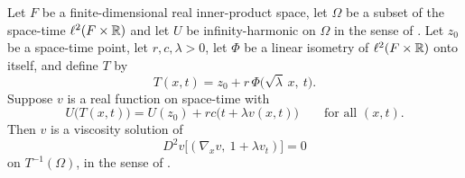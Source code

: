 \begin{lemma}
Let $F$ be a finite-dimensional real inner-product space, let $\Omega$ be a
subset of the space-time $\ell^2(F\times\mathbb{R})$ and let $U$ be infinity-harmonic on
$\Omega$ in the sense of . Let $z_0$ be a space-time
point, let $r,c,\lambda>0$, let $\Phi$ be a linear isometry of
$\ell^2(F\times\mathbb{R})$ onto itself, and define $T$ by
\[
  T(x,t)=z_0+r\,\Phi\bigl(\sqrt\lambda\,x,\ t\bigr).
\]
Suppose $v$ is a real function on space-time with
\begin{equation}\label{eq:anisotropic-rescaling}
  U\bigl(T(x,t)\bigr)=U(z_0)+rc\bigl(t+\lambda v(x,t)\bigr)
  \qquad\text{for all }(x,t).
\end{equation}
Then $v$ is a viscosity solution of
\[
  D^2v\bigl[(\nabla_xv,\ 1+\lambda v_t)\bigr]=0
\]
on $T^{-1}(\Omega)$, in the sense of .
\end{lemma}
